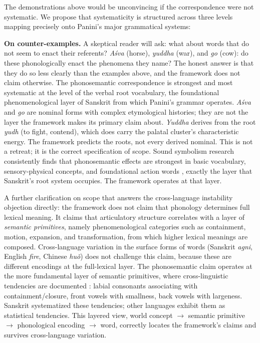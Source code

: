 \documentclass[12pt]{article}
\begin{document}
The demonstrations above would be unconvincing if the correspondence were not systematic. We propose that systematicity is structured across three levels mapping precisely onto Panini's major grammatical systems:

\textbf{On counter-examples.} A skeptical reader will ask: what about words that do not seem to enact their referents? \textit{A{\'{s}}va} (horse), \textit{yuddha} (war), and \textit{go} (cow): do these phonologically enact the phenomena they name? The honest answer is that they do so less clearly than the examples above, and the framework does not claim otherwise. The phonosemantic correspondence is strongest and most systematic at the level of the verbal root vocabulary, the foundational phenomenological layer of Sanskrit from which Panini's grammar operates. \textit{A{\'{s}}va} and \textit{go} are nominal forms with complex etymological histories; they are not the layer the framework makes its primary claim about. \textit{Yuddha} derives from the root \textit{yudh} (to fight, contend), which does carry the palatal cluster's characteristic energy. The framework predicts the roots, not every derived nominal. This is not a retreat; it is the correct specification of scope. Sound symbolism research consistently finds that phonosemantic effects are strongest in basic vocabulary, sensory-physical concepts, and foundational action words \citep{blasi2016, sidhu2025}, exactly the layer that Sanskrit's root system occupies. The framework operates at that layer.

A further clarification on scope that answers the cross-language instability objection directly: the framework does not claim that phonology determines full lexical meaning. It claims that articulatory structure correlates with a layer of \textit{semantic primitives}, namely phenomenological categories such as containment, motion, expansion, and transformation, from which higher lexical meanings are composed. Cross-language variation in the surface forms of words (Sanskrit \textit{agni}, English \textit{fire}, Chinese \textit{hu\v{o}}) does not challenge this claim, because these are different encodings at the full-lexical layer. The phonosemantic claim operates at the more fundamental layer of semantic primitives, where cross-linguistic tendencies are documented \citep{blasi2016}: labial consonants associating with containment/closure, front vowels with smallness, back vowels with largeness. Sanskrit systematized these tendencies; other languages exhibit them as statistical tendencies. This layered view, world concept $\to$ semantic primitive $\to$ phonological encoding $\to$ word, correctly locates the framework's claims and survives cross-language variation.
\end{document}
